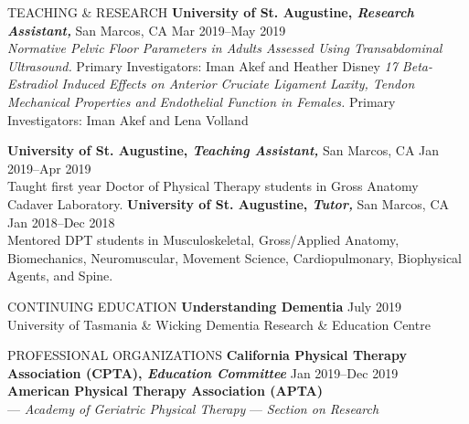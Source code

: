 \documentclass{resume} %
\begin{document}
\begin{rSection}{TEACHING \& RESEARCH}
\textbf{University of St. Augustine, \textit{Research Assistant,}} San Marcos, CA \hfill Mar 2019--May 2019\\
\textit{Normative Pelvic Floor Parameters in Adults Assessed Using Transabdominal Ultrasound.} Primary Investigators: Iman Akef and Heather Disney
\textit{17 Beta-Estradiol Induced Effects on Anterior Cruciate Ligament Laxity, Tendon Mechanical Properties and Endothelial Function in Females.} Primary Investigators: Iman Akef and Lena Volland

\textbf{University of St. Augustine, \textit{Teaching Assistant,}} San Marcos, CA \hfill Jan 2019--Apr 2019 \\
Taught first year Doctor of Physical Therapy students in Gross Anatomy Cadaver Laboratory.
\textbf{University of St. Augustine, \textit{Tutor,}} San Marcos, CA \hfill Jan 2018--Dec 2018 \\
Mentored DPT students in Musculoskeletal, Gross/Applied Anatomy, Biomechanics, Neuromuscular, Movement Science, Cardiopulmonary, Biophysical Agents, and Spine.
\end{rSection} 
\begin{rSection}{CONTINUING EDUCATION}
\textbf{Understanding Dementia} \hfill July 2019\\
University of Tasmania \& Wicking Dementia Research \& Education Centre
\end{rSection}
\begin{rSection}{PROFESSIONAL ORGANIZATIONS}
\textbf{California Physical Therapy Association (CPTA), \textit{Education Committee}} \hfill{Jan 2019--Dec 2019}
~\\
\textbf{American Physical Therapy Association (APTA)}\\
\-\hspace{5mm} --- \textit{Academy of Geriatric Physical Therapy}
\-\hspace{5mm} --- \textit{Section on Research}
\end{rSection} 
\end{document}
